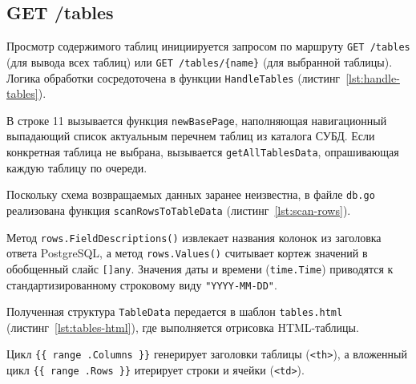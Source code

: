 \subsection{GET /tables}

Просмотр содержимого таблиц инициируется запросом по маршруту \texttt{GET /tables} (для вывода всех таблиц) или \texttt{GET /tables/\{name\}} (для выбранной таблицы). Логика обработки сосредоточена в функции \texttt{HandleTables} (листинг~\ref{lst:handle-tables}).

\begin{listing}[H]
    \caption{Обработчик страницы просмотра таблиц в \texttt{handlers\_tables.go}}
    \label{lst:handle-tables}
\end{listing}

В строке 11 вызывается функция \texttt{newBasePage}, наполняющая навигационный выпадающий список актуальным перечнем таблиц из каталога СУБД. Если конкретная таблица не выбрана, вызывается \texttt{getAllTablesData}, опрашивающая каждую таблицу по очереди.

Поскольку схема возвращаемых данных заранее неизвестна, в файле \texttt{db.go} реализована функция \texttt{scanRowsToTableData} (листинг~\ref{lst:scan-rows}).

\begin{listing}[H]
    \caption{Динамическое чтение метаданных выборки и значений кортежей}
    \label{lst:scan-rows}
\end{listing}

Метод \texttt{rows.FieldDescriptions()} извлекает названия колонок из заголовка ответа PostgreSQL, а метод \texttt{rows.Values()} считывает кортеж значений в обобщенный слайс \texttt{[]any}. Значения даты и времени (\texttt{time.Time}) приводятся к стандартизированному строковому виду \texttt{"YYYY-MM-DD"}.

Полученная структура \texttt{TableData} передается в шаблон \texttt{tables.html} (листинг~\ref{lst:tables-html}), где выполняется отрисовка HTML-таблицы.

\begin{listing}[H]
    \caption{Отрисовка динамической таблицы в \texttt{templates/tables.html}}
    \label{lst:tables-html}
\end{listing}

Цикл \texttt{\{\{ range .Columns \}\}} генерирует заголовки таблицы (\texttt{<th>}), а вложенный цикл \texttt{\{\{ range .Rows \}\}} итерирует строки и ячейки (\texttt{<td>}).
